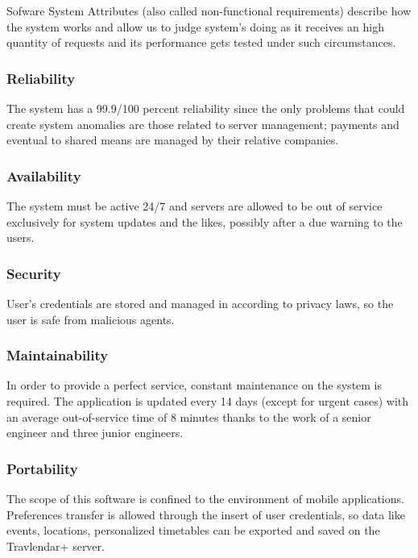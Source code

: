 Sofware System Attributes (also called non-functional requirements) describe how the system works and allow us to judge system's doing as it receives an high quantity of requests and its performance gets tested under such circumstances.

\subsubsection{Reliability}
The system has a 99.9/100 percent reliability since the only problems that could create system anomalies are those related to server management; payments and eventual  to shared means are managed by their relative companies.

\subsubsection{Availability}
The system must be active 24/7 and servers are allowed to be out of service exclusively for system updates and the likes, possibly after a due warning to the users.

\subsubsection{Security}
User's credentials are stored and managed in according to privacy laws, so the user is safe from malicious agents.

\subsubsection{Maintainability}
In order to provide a perfect service, constant maintenance on the system is required. The application is updated every 14 days (except for urgent cases) with an average out-of-service time of 8 minutes thanks to the work of a senior engineer and three junior engineers.

\subsubsection{Portability}
The scope of this software is confined to the environment of mobile applications.  Preferences transfer is allowed through the insert of user credentials, so data like events, locations, personalized timetables can be exported and saved on the Travlendar+ server.
